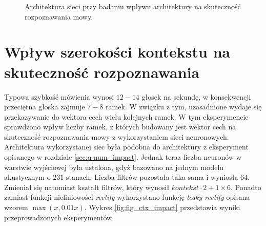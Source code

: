\documentclass[shortabstract, mgr]{iithesis}
\begin{document}
\begin{figure}[H]
		\label{fig:arch_exp}
		\caption{Architektura sieci przy badaniu wpływu architektury na skuteczność rozpoznawania mowy.}
	\end{figure}
	
	
	\section{ Wpływ szerokości kontekstu na skuteczność rozpoznawania }
		Typowa szybkość mówienia wynosi $12-14$ głosek na sekundę, w konsekwencji przeciętna głoska zajmuje $7-8$ ramek. W związku z tym, uzasadnione wydaje się przekazywanie do wektora cech wielu kolejnych ramek. W tym eksperymencie sprawdzono wpływ liczby ramek, z których budowany jest wektor cech na skuteczność rozpoznawania mowy z wykorzystaniem sieci neuronowych. Architektura wykorzystanej siec była podobna do architektury z eksperyment opisanego w rozdziale \ref{sec:q-num_impact}. Jednak teraz liczba neuronów w warstwie wyjściowej była ustalona, gdyż bazowano na jednym modelu akustycznym o $231$ stanach. Liczba filtrów pozostała taka sama i wyniosła $64$. Zmieniał się natomiast kształt filtrów, który wynosił $kontekst \cdot 2 + 1 \times 6$. Ponadto zamiast funkcji nieliniowości \textit{rectify} wykorzystano funkcję \textit{leaky rectify} opisana wzorem $\max(x, 0.01x)$. Wykres \ref{fig:fig_ctx_impact} przedstawia wyniki przeprowadzonych eksperymentów. 
		
\end{document}
